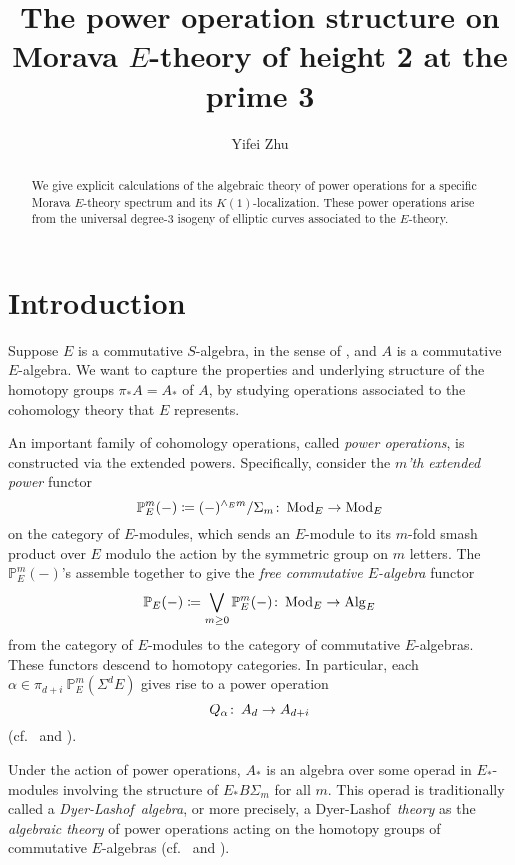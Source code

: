 \documentclass{gtpart}
\title{The power operation structure on Morava $E$-theory of height 2 at the prime 3}
\author{Yifei Zhu}
\theoremstyle{definition}
\theoremstyle{remark}
\def\co{\colon\thinspace}
\newcommand{\mb}[1]{\mathbb{#1}}
\newcommand{\Mod}{{\rm Mod}}
\newcommand{\Alg}{{\rm Alg}}
\newcommand{\DL}{Dyer-Lashof~}
\newcommand{\BP}{{\mb P}}
\newcommand{\A}{\alpha}
\begin{document}
\begin{abstract}
 We give explicit calculations of the algebraic theory of power 
 operations for a specific Morava $E$-theory spectrum and its 
 $K(1)$-localization.  These power operations arise from the universal 
 degree-3 isogeny of elliptic curves associated to the $E$-theory.  
\end{abstract}


\maketitle
\section{Introduction}

Suppose $E$ is a commutative $S$-algebra, in the sense of \cite{EKMM}, 
and $A$ is a commutative $E$-algebra.  We want to capture the properties 
and underlying structure of the homotopy groups $\pi_* A = A_*$ of $A$, 
by studying operations associated to the cohomology theory that $E$ 
represents.  

An important family of cohomology operations, called {\em power 
operations}, is constructed via the extended powers.  Specifically, 
consider the {\em $m$'th extended power} functor 
\[
 \BP_E^m (-) \coloneqq (-)^{\wedge_E m} / \Sigma_m \co \Mod_E \to \Mod_E 
\]
on the category of $E$-modules, which sends an $E$-module to its 
$m$-fold smash product over $E$ modulo the action by the symmetric group 
on $m$ letters.  The $\BP_E^m (-)$'s assemble together to give the {\em 
free commutative $E$-algebra} functor 
\[
 \BP_E (-) \coloneqq \bigvee_{m \geq 0} \BP_E^m (-) \co \Mod_E \to \Alg_E 
\]
from the category of $E$-modules to the category of commutative 
$E$-algebras.  These functors descend to homotopy categories.  In 
particular, each $\A \in \pi_{d+i}~\BP_E^m (\Sigma^d E)$ gives rise to a 
power operation 
\[
 Q_\A \co A_d \to A_{d+i} 
\]
(cf.~\cite[Sections I.2 and IX.1]{H_infty} and \cite[Section 3]{cong}).  

Under the action of power operations, $A_*$ is an algebra over some 
operad in $E_*$-modules involving the structure of $E_* B\Sigma_m$ for 
all $m$.  This operad is traditionally called a {\em \DL algebra}, or 
more precisely, a \DL {\em theory} as the {\em algebraic theory} of 
power operations acting on the homotopy groups of commutative 
$E$-algebras (cf.~\cite[Chapters III, VIII, and IX]{H_infty} and 
\cite[Section 9]{lpo}).  
\end{document}
